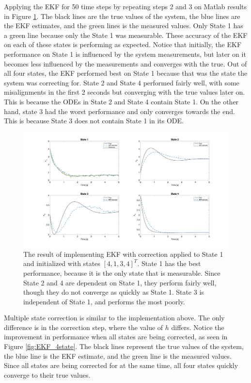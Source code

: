 \newpage
\noindent Applying the EKF for 50 time steps by repeating steps 2 and 3 on Matlab results in Figure \ref{fig:EKF_1state}. The black lines are the true values of the system, the blue lines are the EKF estimates, and the green lines is the measured values. Only State 1 has a green line because only the State 1 was measurable. These accuracy of the EKF on each of these states is performing as expected. Notice that initially, the EKF performance on State 1 is influenced by the system measurements, but later on it becomes less influenced by the measurements and converges with the true. Out of all four states, the EKF performed best on State 1 because that was the state the system was correcting for.  State 2 and State 4 performed fairly well, with some misalignments in the first 2 seconds but converging with the true values later on. This is because the ODEs in State 2 and State 4 contain State 1. On the other hand, state 3 had the worst performance and only converges towards the end. This is because State 3 does not contain State 1 in its ODE.  \\

\begin{figure}[ht]
    \centering
    \includegraphics[scale = 0.24]{EKF_1state.png}
    \caption{The result of implementing EKF with correction applied to State 1 and initialized with states $[4, 1, 3, 4]^T$. State 1 has the best performance, because it is the only state that is measurable. Since State 2 and 4 are dependent on State 1, they perform fairly well, though they do not converge as quickly as State 1. State 3 is independent of State 1, and performs the most poorly.}
    \label{fig:EKF_1state}
  \end{figure}
  \clearpage


\noindent Multiple state correction is similar to the implementation above. The only difference is in the correction step, where the value of $h$ differs. Notice the improvement in performance when all states are being corrected, as seen in Figure \ref{fig:EKF_4state}. The black lines represent the true values of the system, the blue line is the EKF estimate, and the green line is the measured values.  Since all states are being corrected for at the same time, all four states quickly converge to their true values. \\


